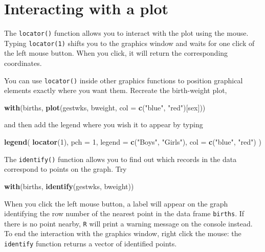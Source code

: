 \documentclass[
]{book}
\newenvironment{Shaded}{\begin{snugshade}}{\end{snugshade}}
\newcommand{\AttributeTok}[1]{\textcolor[rgb]{0.13,0.29,0.53}{#1}}
\newcommand{\DecValTok}[1]{\textcolor[rgb]{0.00,0.00,0.81}{#1}}
\newcommand{\FunctionTok}[1]{\textcolor[rgb]{0.13,0.29,0.53}{\textbf{#1}}}
\newcommand{\NormalTok}[1]{#1}
\newcommand{\StringTok}[1]{\textcolor[rgb]{0.31,0.60,0.02}{#1}}
\begin{document}
\section{Interacting with a plot}\label{interacting-with-a-plot}

The \texttt{locator()} function allows you to interact with the plot
using the mouse. Typing \texttt{locator(1)} shifts you to the graphics
window and waits for one click of the left mouse button. When you click,
it will return the corresponding coordinates.

You can use \texttt{locator()} inside other graphics functions to position
graphical elements exactly where you want them. Recreate the birth-weight
plot,

\begin{Shaded}
\begin{Highlighting}[]
\FunctionTok{with}\NormalTok{(births, }\FunctionTok{plot}\NormalTok{(gestwks, bweight, }\AttributeTok{col =} \FunctionTok{c}\NormalTok{(}\StringTok{"blue"}\NormalTok{, }\StringTok{"red"}\NormalTok{)[sex]))}
\end{Highlighting}
\end{Shaded}

and then add the legend where you wish it to appear by typing

\begin{Shaded}
\begin{Highlighting}[]
\FunctionTok{legend}\NormalTok{(}
  \FunctionTok{locator}\NormalTok{(}\DecValTok{1}\NormalTok{), }
  \AttributeTok{pch =} \DecValTok{1}\NormalTok{, }
  \AttributeTok{legend =} \FunctionTok{c}\NormalTok{(}\StringTok{"Boys"}\NormalTok{, }\StringTok{"Girls"}\NormalTok{), }
  \AttributeTok{col =} \FunctionTok{c}\NormalTok{(}\StringTok{"blue"}\NormalTok{, }\StringTok{"red"}\NormalTok{)}
\NormalTok{)}
\end{Highlighting}
\end{Shaded}

The \texttt{identify()} function allows you to find out which records
in the data correspond to points on the graph. Try

\begin{Shaded}
\begin{Highlighting}[]
\FunctionTok{with}\NormalTok{(births, }\FunctionTok{identify}\NormalTok{(gestwks, bweight))}
\end{Highlighting}
\end{Shaded}

When you click the left mouse button, a label will appear on the graph
identifying the row number of the nearest point in the data frame
\texttt{births}. If there is no point nearby, \texttt{R} will print a warning
message on the console instead. To end the interaction with the
graphics window, right click the mouse: the \texttt{identify} function
returns a vector of identified points.
\end{document}
